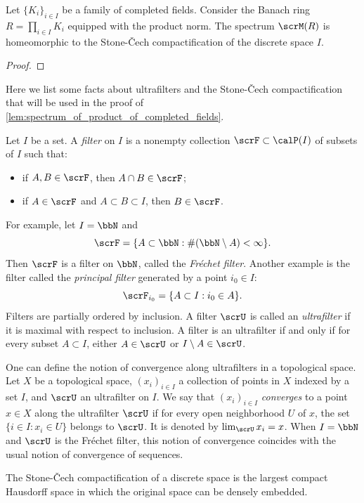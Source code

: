     \begin{lemma}\label{lem:spectrum_of_product_of_completed_fields}
        Let \(\{K_i\}_{i \in I}\) be a family of completed fields.
        Consider the Banach ring \(R = \prod_{i \in I} K_i\) equipped with the product norm.
        The spectrum \(\scrM(R)\) is homeomorphic to the Stone-\v{C}ech compactification of the discrete space \(I\).
    \end{lemma}
    \begin{proof}
    \end{proof}

    \begin{remark}\label{rmk:some_fact_about_the_ultrafilters_and_Stone_Cech_compactification}
        Here we list some facts about ultrafilters and the Stone-\v{C}ech compactification that will be used in the proof of \cref{lem:spectrum_of_product_of_completed_fields}.
        
        Let \(I\) be a set.
        A \emph{filter} on \(I\) is a nonempty collection \(\scrF \subset \calP(I)\) of subsets of \(I\) such that:
        \begin{itemize}
            \item if \(A, B \in \scrF\), then \(A \cap B \in \scrF\);
            \item if \(A \in \scrF\) and \(A \subset B \subset I\), then \(B \in \scrF\).
        \end{itemize}
        For example, let \(I = \bbN\) and 
        \[ \scrF = \{ A \subset \bbN : \#(\bbN \setminus A) < \infty \}. \]
        Then \(\scrF\) is a filter on \(\bbN\), called the \emph{Fr\'echet filter}.
        Another example is the filter called the \emph{principal filter} generated by a point \(i_0 \in I\):
        \[ \scrF_{i_0} = \{ A \subset I : i_0 \in A \}. \]
        Filters are partially ordered by inclusion.
        A filter \(\scrU\) is called an \emph{ultrafilter} if it is maximal with respect to inclusion.
        A filter is an ultrafilter if and only if for every subset \(A \subset I\), either \(A \in \scrU\) or \(I \setminus A \in \scrU\).

        One can define the notion of convergence along ultrafilters in a topological space.
        Let \(X\) be a topological space, \((x_i)_{i \in I}\) a collection of points in \(X\) indexed by a set \(I\), and \(\scrU\) an ultrafilter on \(I\).
        We say that \((x_i)_{i \in I}\) \emph{converges} to a point \(x \in X\) along the ultrafilter \(\scrU\) if for every open neighborhood \(U\) of \(x\), the set \(\{i \in I : x_i \in U\}\) belongs to \(\scrU\).
        It is denoted by \(\lim_{\scrU} x_i = x\).
        When \(I = \bbN\) and \(\scrU\) is the Fr\'echet filter, this notion of convergence coincides with the usual notion of convergence of sequences.

        The Stone-\v{C}ech compactification of a discrete space is the largest compact Hausdorff space in which the original space can be densely embedded.
    \end{remark}

